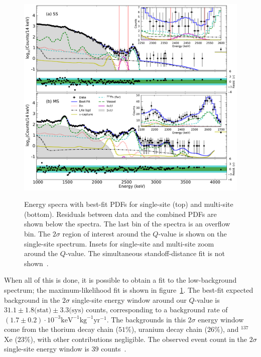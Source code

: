\begin{figure}
\begin{center}
\includegraphics[keepaspectratio=true,width=\textwidth]{Energy_BestFit_frompaper.pdf}
\end{center}
\renewcommand{\baselinestretch}{1}
\small\normalsize
\begin{quote}
\caption{Energy specra with best-fit PDFs for single-site (top) and multi-site (bottom).  Residuals between data and the combined PDFs are shown below the spectra.  The last bin of the spectra is an overflow bin.  The $2\sigma$ region of interest around the $Q$-value is shown on the single-site spectrum.  Insets for single-site and multi-site zoom around the $Q$-value.  The simultaneous standoff-distance fit is not shown~\cite{NewEXObb0nPaper_2014}.}
\label{fig:BestFitEnergyFromPaper}
\end{quote}
\end{figure}
\renewcommand{\baselinestretch}{2}
\small\normalsize

When all of this is done, it is possible to obtain a fit to the low-background spectrum; the maximum-likelihood fit is shown in figure~\ref{fig:BestFitEnergyFromPaper}.  The best-fit expected background in the $2\sigma$ single-site energy window around our $Q$-value is $31.1 \pm 1.8\text{(stat)} \pm 3.3\text{(sys)}$ counts, corresponding to a background rate of $(1.7 \pm 0.2)\cdot 10^{-3} \text{keV}^{-1} \text{kg}^{−1} \text{yr}^{−1}$.  The backgrounds in this $2\sigma$ energy window come from the thorium decay chain ($51\%$), uranium decay chain ($26\%$), and $^{137}$Xe ($23\%$), with other contributions negligible.  The observed event count in the $2\sigma$ single-site energy window is $39$ counts~\cite{NewEXObb0nPaper_2014}.


